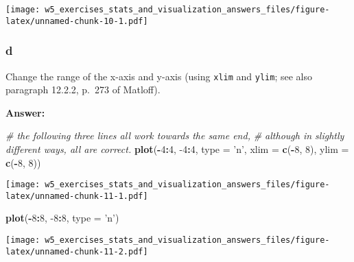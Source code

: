 \documentclass[]{article}
\newenvironment{Shaded}{\begin{snugshade}}{\end{snugshade}}
\newcommand{\CommentTok}[1]{\textcolor[rgb]{0.56,0.35,0.01}{\textit{#1}}}
\newcommand{\DataTypeTok}[1]{\textcolor[rgb]{0.13,0.29,0.53}{#1}}
\newcommand{\DecValTok}[1]{\textcolor[rgb]{0.00,0.00,0.81}{#1}}
\newcommand{\KeywordTok}[1]{\textcolor[rgb]{0.13,0.29,0.53}{\textbf{#1}}}
\newcommand{\NormalTok}[1]{#1}
\newcommand{\OperatorTok}[1]{\textcolor[rgb]{0.81,0.36,0.00}{\textbf{#1}}}
\newcommand{\StringTok}[1]{\textcolor[rgb]{0.31,0.60,0.02}{#1}}
\begin{document}
\texttt{[image: w5\_exercises\_stats\_and\_visualization\_answers\_files/figure-latex/unnamed-chunk-10-1.pdf]}

\hypertarget{d-1}{%
\subsubsection{d}\label{d-1}}

Change the range of the x-axis and y-axis (using \texttt{xlim} and
\texttt{ylim}; see also paragraph 12.2.2, p.~273 of Matloff).

\textbf{Answer:}

\begin{Shaded}
\begin{Highlighting}[]
\CommentTok{# the following three lines all work towards the same end,}
\CommentTok{# although in slightly different ways, all are correct.}
\KeywordTok{plot}\NormalTok{(}\OperatorTok{-}\DecValTok{4}\OperatorTok{:}\DecValTok{4}\NormalTok{, }\DecValTok{-4}\OperatorTok{:}\DecValTok{4}\NormalTok{, }\DataTypeTok{type =} \StringTok{'n'}\NormalTok{, }\DataTypeTok{xlim =} \KeywordTok{c}\NormalTok{(}\OperatorTok{-}\DecValTok{8}\NormalTok{, }\DecValTok{8}\NormalTok{), }\DataTypeTok{ylim =} \KeywordTok{c}\NormalTok{(}\OperatorTok{-}\DecValTok{8}\NormalTok{, }\DecValTok{8}\NormalTok{))}
\end{Highlighting}
\end{Shaded}

\texttt{[image: w5\_exercises\_stats\_and\_visualization\_answers\_files/figure-latex/unnamed-chunk-11-1.pdf]}

\begin{Shaded}
\begin{Highlighting}[]
\KeywordTok{plot}\NormalTok{(}\OperatorTok{-}\DecValTok{8}\OperatorTok{:}\DecValTok{8}\NormalTok{, }\DecValTok{-8}\OperatorTok{:}\DecValTok{8}\NormalTok{, }\DataTypeTok{type =} \StringTok{'n'}\NormalTok{)}
\end{Highlighting}
\end{Shaded}

\texttt{[image: w5\_exercises\_stats\_and\_visualization\_answers\_files/figure-latex/unnamed-chunk-11-2.pdf]}
\end{document}
